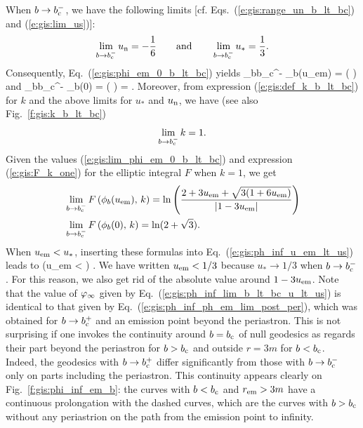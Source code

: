When $b \to b_{\rm c}^-$, we have the following limits
[cf. Eqs.~(\ref{e:gis:range_un_b_lt_bc}) and (\ref{e:gis:lim_us})]:
\[
 \lim_{b\to b_{\rm c}^-} u_{\rm n} = - \frac{1}{6}
 \qquad\mbox{and}\qquad
 \lim_{b\to b_{\rm c}^-} u_* = \frac{1}{3} .
\]
Consequently, Eq.~(\ref{e:gis:phi_em_0_b_lt_bc}) yields
\be \label{e:gis:lim_phi_em_0_b_lt_bc}
   \lim_{b\to b_{\rm c}^-} \phi_b(u_{\rm em}) =
    \arccos\left(  \right)
   \quad\mbox{and}\quad
   \lim_{b\to b_{\rm c}^-} \phi_b(0) = \arccos\left(  \right) = .
\ee
Moreover, from expression (\ref{e:gis:def_k_b_lt_bc}) for $k$ and the above
limits for $u_*$ and $u_{\rm n}$, we have (see also Fig.~\ref{f:gis:k_b_lt_bc})
\[
    \lim_{b\to b_{\rm c}^-} k = 1 .
\]
Given the values (\ref{e:gis:lim_phi_em_0_b_lt_bc}) and expression
(\ref{e:gis:F_k_one}) for the elliptic integral $F$ when $k=1$, we get
\begin{subequations}
\label{e:gis:lim_F_em_0_b_lt_bc}
\begin{align}
    & \lim_{b\to b_{\rm c}^-} F \left( \phi_b(u_{\rm em}),\, k \right)  =
    \ln \left(
      \frac{2 + 3 u_{\rm em} + \sqrt{3(1+6 u_{\rm em})}}{|1 - 3 u_{\rm em}|}
      \right) \\
    & \lim_{b\to b_{\rm c}^-} F \left( \phi_b(0),\, k \right)  = \ln(2 + \sqrt{3}) .
\end{align}
\end{subequations}
When $u_{\rm em} < u_*$, inserting these formulas into
Eq.~(\ref{e:gis:ph_inf_u_em_lt_us}) leads to
\be \label{e:gis:ph_inf_lim_b_lt_bc_u_lt_us}
    \qquad \left(u_{\rm em} <  \right) .
\ee
We have written $u_{\rm em} < 1/3$ because $u_*\to 1/3$ when
$b\to b_{\rm c}^-$. For this reason, we also get rid of the absolute value
around $1 - 3  u_{\rm em}$.
Note that the value of $\varphi_\infty$ given by Eq.~(\ref{e:gis:ph_inf_lim_b_lt_bc_u_lt_us})
is identical to that given by Eq.~(\ref{e:gis:ph_inf_ph_em_lim_post_per}),
which was obtained for $b\to b_{\rm c}^+$ and an emission point beyond the
periastron. This is not surprising if one invokes the continuity around $b=b_{\rm c}$ of
null geodesics as regards their part beyond the periastron for $b > b_{\rm c}$
and outside $r = 3 m$ for $b < b_{\rm c}$. Indeed, the geodesics with $b \to b_{\rm c}^+$
differ significantly from those with $b \to b_{\rm c}^-$ only on
parts including the periastron. This continuity appears clearly on Fig.~\ref{f:gis:phi_inf_em_b}:
the curves with $b<b_{\rm c}$ and $r_{\rm em} > 3 m$ have a continuous prolongation
with the dashed curves, which are the curves with $b>b_{\rm c}$ without any periastrion
on the path from the emission point to infinity.

